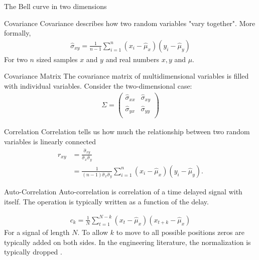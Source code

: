 \documentclass{beamer}
\begin{document}
    \begin{frame}{The Bell curve in two dimensions}
      
    \end{frame}

    \begin{frame}{Covariance}
      Covariance describes how two random variables "vary together"\cite{haslwanter2016introduction}.
      More formally,
      \begin{align}
      \hat{\sigma}_{xy} = \frac{1}{n - 1}\sum_{i=1}^n (x_i - \hat{\mu}_x)(y_i - \hat{\mu}_y)
      \end{align}
      For two $n$ sized samples $x$ and $y$ and real numbers $x,y$ and $\mu$.
    \end{frame}

    \begin{frame}{Covariance Matrix}
      The covariance matrix of multidimensional variables is filled with individual variables.
      Consider the two-dimensional case:
      \begin{align}
        \Sigma = \begin{pmatrix}
          \hat{\sigma}_{xx} & \hat{\sigma}_{xy} \\
          \hat{\sigma}_{yx} & \hat{\sigma}_{yy} \\
        \end{pmatrix}
      \end{align}

    \end{frame}


    \begin{frame}{Correlation}
    Correlation tells us how much the relationship between two random variables is linearly connected
    \cite{haslwanter2016introduction}
    \begin{align}
      r_{xy} & = \frac{\hat{\sigma}_{xy}}{\hat{\sigma}_x \hat{\sigma}_y} \\
             & = \frac{1}{{(n-1)} \hat{\sigma}_x \hat{\sigma}_y} \sum_{i=1}^{n} (x_i - \hat{\mu}_x)(y_i - \hat{\mu}_y).
    \end{align}
  
  \end{frame}

    \begin{frame}{Auto-Correlation}
      Auto-correlation \cite{haslwanter2016introduction} is correlation of a time delayed signal with itself.
      The operation is typically written as a function of the delay.

      \begin{align}
        c_{k} = \frac{1}{N}\sum_{t=1}^{N-k} (x_t - \hat{\mu}_x)(x_{t + k} - \hat{\mu}_x)
      \end{align}
      For a signal of length $N$. To allow $k$ to move to all possible positions zeros are typically added
      on both sides.
      In the engineering literature, the normalization is typically dropped \cite{haslwanter2016introduction}.

    \end{frame}
\end{document}
